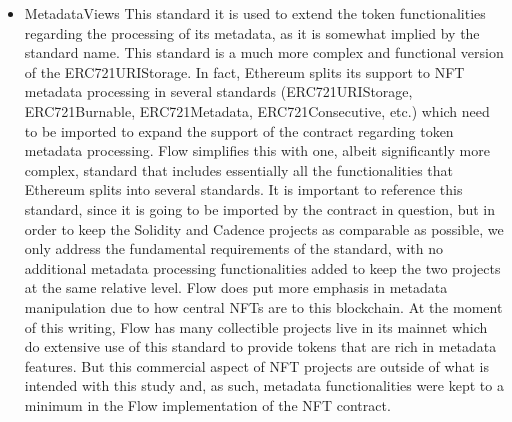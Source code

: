 \documentclass[../main.tex]{subfiles}
\begin{document}
\begin{itemize}
    \item {MetadataViews} This standard it is used to extend the token functionalities regarding the processing of its metadata, as it is somewhat implied by the standard name. This standard is a much more complex and functional version of the ERC721URIStorage. In fact, Ethereum splits its support to NFT metadata processing in several standards (ERC721URIStorage, ERC721Burnable, ERC721Metadata, ERC721Consecutive, etc.) which need to be imported to expand the support of the contract regarding token metadata processing. Flow simplifies this with one, albeit significantly more complex, standard that includes essentially all the functionalities that Ethereum splits into several standards. It is important to reference this standard, since it is going to be imported by the contract in question, but in order to keep the Solidity and Cadence projects as comparable as possible, we only address the fundamental requirements of the standard, with no additional metadata processing functionalities added to keep the two projects at the same relative level. Flow does put more emphasis in metadata manipulation due to how central NFTs are to this blockchain. At the moment of this writing, Flow has many collectible projects live in its mainnet which do extensive use of this standard to provide tokens that are rich in metadata features. But this commercial aspect of NFT projects are outside of what is intended with this study and, as such, metadata functionalities were kept to a minimum in the Flow implementation of the NFT contract.
\end{itemize}
\end{document}
